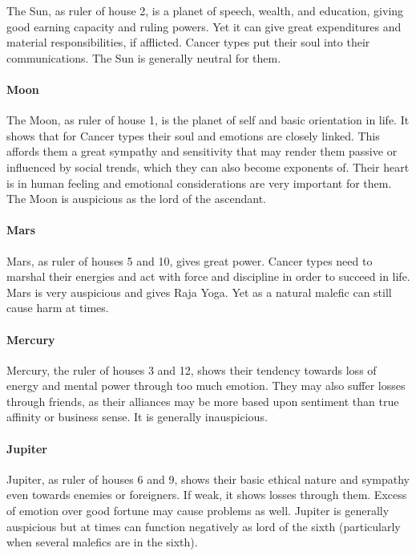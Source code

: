 The Sun, as ruler of house 2, is a planet of speech, wealth, and education, giving good earning capacity and ruling powers. Yet it can give great expenditures and material responsibilities, if afflicted. Cancer types put their soul into their communications. The Sun is generally neutral for them.

 

\paragraph{Moon}

The Moon, as ruler of house 1, is the planet of self and basic orientation in life. It shows that for Cancer types their soul and emotions are closely linked. This affords them a great sympathy and sensitivity that may render them passive or influenced by social trends, which they can also become exponents of. Their heart is in human feeling and emotional considerations are very important for them. The Moon is auspicious as the lord of the ascendant.

 

\paragraph{Mars}

Mars, as ruler of houses 5 and 10, gives great power. Cancer types need to marshal their energies and act with force and discipline in order to succeed in life. Mars is very auspicious and gives Raja Yoga. Yet as a natural malefic can still cause harm at times.

 

\paragraph{Mercury}

Mercury, the ruler of houses 3 and 12, shows their tendency towards loss of energy and mental power through too much emotion. They may also suffer losses through friends, as their alliances may be more based upon sentiment than true affinity or business sense. It is generally inauspicious.

 

\paragraph{Jupiter}

Jupiter, as ruler of houses 6 and 9, shows their basic ethical nature and sympathy even towards enemies or foreigners. If weak, it shows losses through them. Excess of emotion over good fortune may cause problems as well. Jupiter is generally auspicious but at times can function negatively as lord of the sixth (particularly when several malefics are in the sixth).

